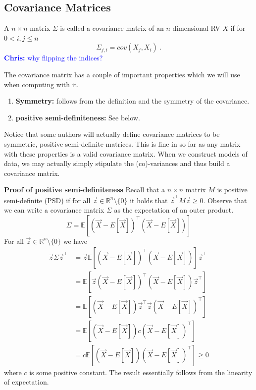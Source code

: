 \documentclass[a4paper,11pt,leqno]{report}\usepackage[]{graphicx}\usepackage[]{color}
\newcommand{\E}{\mathbb{E}}
\newcommand{\chris}[1]{ \textcolor{blue}{\textbf{Chris:} #1}}
\begin{document}
\subsection{Covariance Matrices}

\begin{Definition}
A $ n \times n $ matrix $ \Sigma $ is called a covariance matrix of an $ n $-dimensional RV $ X $ if for $ 0 < i,j \leq n $ 
$$ \Sigma_{j,i} = cov(X_{j}, X_{i}) \ . $$ \chris{why flipping the indices?}
\end{Definition}

The covariance matrix has a couple of important properties which we will use when computing with it.
\begin{enumerate}
\item \textbf{Symmetry:} follows from the definition and the symmetry of the covariance.
\item \textbf{positive semi-definiteness:} See below.
\end{enumerate}
Notice that some authors will actually define covariance matrices to be symmetric, positive semi-definite matrices. This is fine in so far as any matrix with
these properties is a valid covariance matrix. When we construct models of data, we may actually simply stipulate the (co)-variances and thus build a covariance matrix.

\textbf{Proof of positive semi-definiteness} Recall that a $ n \times n $ matrix $ M $ is positive semi-definite (PSD) 
if for all $ \vec{z} \in \mathbb{R}^{n}\setminus \{0\} $ it holds
that $ \vec{z}^{\top}M\vec{z} \geq 0 $. Observe that we can write a covariance matrix $ \Sigma $ as the expectation of an outer product. 
\begin{equation}
\Sigma = \E\left[(\vec{X} - E[\vec{X}])^{\top}(\vec{X} - E[\vec{X}])\right]
\end{equation}
For all $ \vec{z} \in 
\mathbb{R}^{n}\setminus \{0\} $ we have
\begin{align}
\vec{z}\Sigma \vec{z}^{\top} 
&= \vec{z} \E\left[(\vec{X} - E[\vec{X}])^{\top}(\vec{X} - E[\vec{X}])\right] \vec{z}^{\top} \\
&=  \E\left[ \vec{z} (\vec{X} - E[\vec{X}])^{\top}(\vec{X} - E[\vec{X}]) \vec{z}^{\top} \right] \\
&= \E\left[(\vec{X} - E[\vec{X}])\vec{z}^{\top}\vec{z} (\vec{X} - E[\vec{X}])^{\top} \right] \\
&= \E\left[(\vec{X} - E[\vec{X}])c (\vec{X} - E[\vec{X}])^{\top} \right] \\
&= c \E\left[(\vec{X} - E[\vec{X}]) (\vec{X} - E[\vec{X}])^{\top} \right] \geq 0
\end{align}
where $ c $ is some positive constant. The result essentially follows from the linearity of expectation. 
\end{document}
